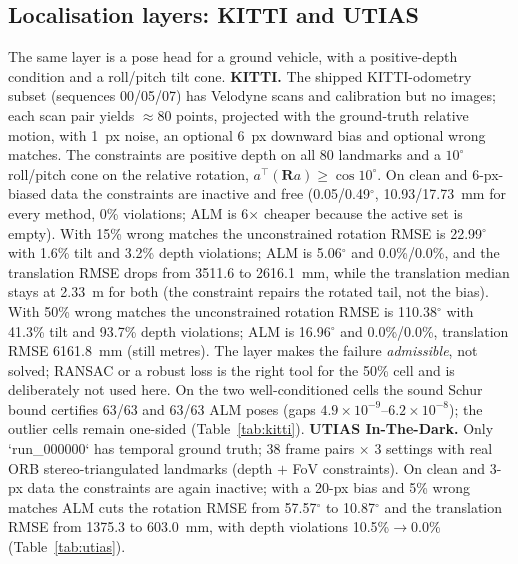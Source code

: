 \subsection{Localisation layers: KITTI and UTIAS}\label{sec:local}
The same layer is a pose head for a ground vehicle, with a positive-depth condition and a roll/pitch tilt cone. \textbf{KITTI.} The shipped KITTI-odometry subset (sequences 00/05/07) has Velodyne scans and calibration but no images; each scan pair yields $\approx$80 points, projected with the ground-truth relative motion, with 1~px noise, an optional 6~px downward bias and optional wrong matches. The constraints are positive depth on all 80 landmarks and a $10^\circ$ roll/pitch cone on the relative rotation, $a^\top(\mathbf R a)\ge\cos10^\circ$. On clean and 6-px-biased data the constraints are inactive and free (0.05/0.49$^\circ$, 10.93/17.73~mm for every method, 0\% violations; ALM is 6$\times$ cheaper because the active set is empty). With 15\% wrong matches the unconstrained rotation RMSE is 22.99$^\circ$ with 1.6\% tilt and 3.2\% depth violations; ALM is 5.06$^\circ$ and 0.0\%/0.0\%, and the translation RMSE drops from 3511.6 to 2616.1~mm, while the translation median stays at 2.33~m for both (the constraint repairs the rotated tail, not the bias). With 50\% wrong matches the unconstrained rotation RMSE is 110.38$^\circ$ with 41.3\% tilt and 93.7\% depth violations; ALM is 16.96$^\circ$ and 0.0\%/0.0\%, translation RMSE 6161.8~mm (still metres). The layer makes the failure \emph{admissible}, not solved; RANSAC or a robust loss is the right tool for the 50\% cell and is deliberately not used here. On the two well-conditioned cells the sound Schur bound certifies 63/63 and 63/63 ALM poses (gaps $4.9\times10^{-9}$--$6.2\times10^{-8}$); the outlier cells remain one-sided (Table~\ref{tab:kitti}). \textbf{UTIAS In-The-Dark.} Only `run\_000000` has temporal ground truth; 38 frame pairs $\times$ 3 settings with real ORB stereo-triangulated landmarks (depth $+$ FoV constraints). On clean and 3-px data the constraints are again inactive; with a 20-px bias and 5\% wrong matches ALM cuts the rotation RMSE from 57.57$^\circ$ to 10.87$^\circ$ and the translation RMSE from 1375.3 to 603.0~mm, with depth violations 10.5\%$\to$0.0\% (Table~\ref{tab:utias}).

